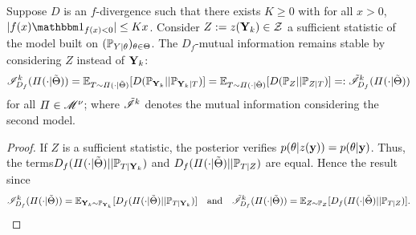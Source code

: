 \begin{prop}
    Suppose $D$ is an $f$-divergence such that there exists $K\geq0$ with for all $x>0$, $|f(x)\indic_{f(x)<0}|\leq Kx $.
    Consider $Z:=z(\mathbf{Y}_k)\in\mathcal{Z}$ a sufficient statistic of the model built on $(\mathbb{P}_{Y|\theta})_{\theta\in\Theta}$. %
    The $D_f$-mutual information remains stable by considering $Z$ instead of $\mathbf{Y}_k$:
    \begin{equation}
        \mathscr{I}^k_{D_f}(\varPi(\cdot|\tilde\Theta)) = \mathbb{E}_{T\sim\varPi(\cdot|\tilde\Theta)}[D(\mathbb{P}_{\mathbf{Y}_k}||\mathbb{P}_{\mathbf{Y}_k|T} )] = \mathbb{E}_{T\sim\varPi(\cdot|\tilde\Theta)}[D(\mathbb{P}_{Z}||\mathbb{P}_{Z|T} )] =: \tilde{\mathscr{I}}_{D_f}^k(\varPi(\cdot|\tilde\Theta))
    \end{equation}
    for all $\varPi\in\mathscr{M}^\nu$; where $\tilde{\mathscr{I}}^k$ denotes the mutual information considering the second model.
\end{prop}

\begin{proof}
    If $Z$ is a sufficient statistic, the posterior verifies $p(\theta|z(\mathbf{y}))= p(\theta|\mathbf{y})$. Thus, the terms$D_f(\varPi(\cdot|\tilde\Theta)||\mathbb{P}_{T|\mathbf{Y}_k})$ and $D_f(\varPi(\cdot|\tilde\Theta)||\mathbb{P}_{T|Z})  $ are equal. Hence the result since
        \begin{equation}
            \mathscr{I}^k_{D_f}(\varPi(\cdot|\tilde\Theta)) = \mathbb{E}_{\mathbf{Y}_k\sim\mathbb{P}_{\mathbf{Y}_k}}[D_f(\varPi(\cdot|\tilde\Theta)||\mathbb{P}_{T|\mathbf{Y}_k}) ] \quad\text{and} \quad \tilde{\mathscr{I}}^k_{D_f}(\varPi(\cdot|\tilde\Theta)) = \mathbb{E}_{ Z\sim\mathbb{P}_{Z}}[D_f(\varPi(\cdot|\tilde\Theta)||\mathbb{P}_{T|Z}) ] .
        \end{equation}
\end{proof}


